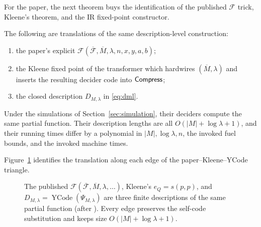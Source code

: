 For the paper, the next theorem buys the identification of the published
\(\mathcal F\) trick, Kleene's theorem, and the IR fixed-point constructor.
\begin{theorem}
\label{thm:fixed-point-equivalence}\enspace%
The following are translations of the same description-level construction:
\begin{enumerate}
\item the paper's explicit
\(\mathcal F(\overline{\mathcal F},\overline M,\lambda,n,x,y,a,b)\);
\item the Kleene fixed point of the transformer which hardwires
\((\overline M,\lambda)\) and inserts the resulting decider code into \(\mathsf{Compress}\);
\item the closed description \(D_{M,\lambda}\) in \eqref{eq:dml}.
\end{enumerate}
Under the simulations of Section~\ref{sec:simulation}, their deciders compute
the same partial function.  Their description lengths are all
\(O(|M|+\log\lambda+1)\), and their running times differ by a polynomial in
\(|M|,\log\lambda,n\), the invoked fuel bounds, and the invoked machine times.
\end{theorem}

Figure~\ref{fig:three-presentations} identifies the translation along each
edge of the paper--Kleene--YCode triangle.
\begin{figure}[H]
\centering

\caption{The published \(\mathcal F(\overline{\mathcal F},\overline M,\lambda,\ldots)\), Kleene's \(e_Q=s(p,p)\), and \(D_{M,\lambda}=\operatorname{YCode}(\Psi_{M,\lambda})\) are three finite descriptions of the same partial function (after ).  Every edge preserves the self-code substitution and keeps size \(O(|M|+\log\lambda+1)\).}
\label{fig:three-presentations}
\end{figure}


